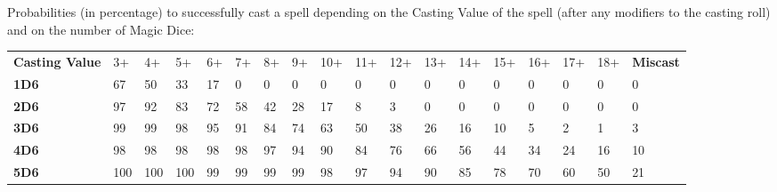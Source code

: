 

Probabilities (in percentage) to successfully cast a spell depending on the Casting Value of the spell (after any modifiers to the casting roll) and on the number of Magic Dice:
{
\begin{center}
\setlength{\tabcolsep}{3pt}
\alternaterowcolors\begin{tabular}{M{3cm}*{16}{M{0.58cm}}M{1.5cm}}
\hline
\textbf{Casting Value} & 3+ & 4+ & 5+ & 6+ & 7+ & 8+ & 9+ & 10+ & 11+ & 12+ & 13+ & 14+ & 15+ & 16+ & 17+ & 18+ & \textbf{Miscast} \\
\textbf{1D6} & \num{67} & \num{50} & \num{33} & \num{17} & \num{0} & \num{0} & \num{0} & \num{0} & \num{0} & \num{0} & \num{0} & \num{0} & \num{0} & \num{0} & \num{0} & \num{0} & \num{0} \\
\textbf{2D6} & \num{97} & \num{92} & \num{83} & \num{72} & \num{58} & \num{42} & \num{28} & \num{17} & \num{8} & \num{3} & \num{0} & \num{0} & \num{0} & \num{0} & \num{0} & \num{0} & \num{0} \\
\textbf{3D6} & \num{99} & \num{99} & \num{98} & \num{95} & \num{91} & \num{84} & \num{74} & \num{63} & \num{50} & \num{38} & \num{26} & \num{16} & \num{10} & \num{5} & \num{2} & \num{1} & \num{3} \\
\textbf{4D6} & \num{98} & \num{98} & \num{98} & \num{98} & \num{98} & \num{97} & \num{94} & \num{90} & \num{84} & \num{76} & \num{66} & \num{56} & \num{44} & \num{34} & \num{24} & \num{16} & \num{10} \\
\textbf{5D6} & \num{100} & \num{100} & \num{100} & \num{99} & \num{99} & \num{99} & \num{99} & \num{98} & \num{97} & \num{94} & \num{90} & \num{85} & \num{78} & \num{70} & \num{60} & \num{50} & \num{21} \\
\hline
\end{tabular}
\end{center}
}

